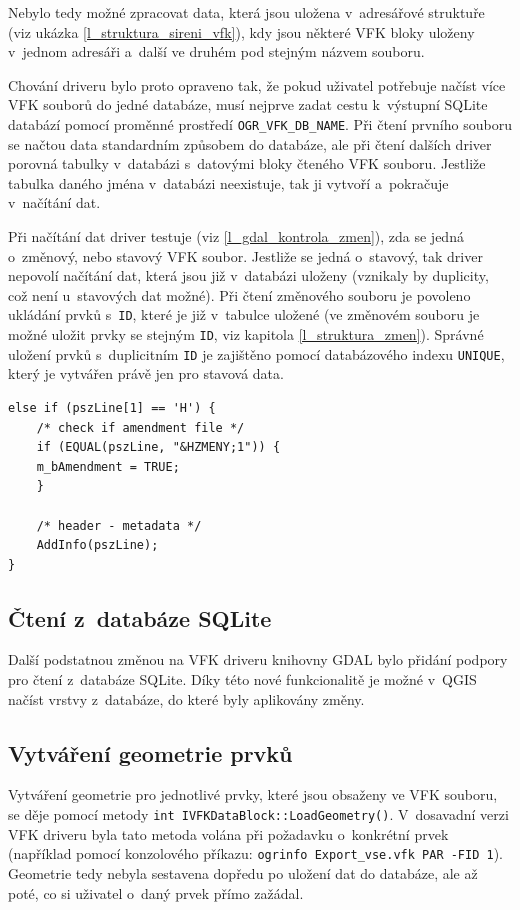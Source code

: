 \documentclass[a4paper,12pt,oneside]{book}
\begin{document}
Nebylo tedy možné zpracovat data, která jsou uložena v~adresářové struktuře (viz ukázka \ref{l_struktura_sireni_vfk}), kdy jsou některé VFK bloky uloženy v~jednom adresáři a~další ve druhém pod stejným názvem souboru.

Chování driveru bylo proto opraveno tak, že pokud uživatel potřebuje načíst více VFK souborů do jedné databáze, musí nejprve zadat cestu k~výstupní SQLite databází pomocí proměnné prostředí \texttt{OGR\_VFK\_DB\_NAME}. Při čtení prvního souboru se načtou data standardním způsobem do databáze, ale při čtení dalších driver porovná tabulky v~databázi s~datovými bloky čteného VFK souboru. Jestliže tabulka daného jména v~databázi neexistuje, tak ji vytvoří a~pokračuje v~načítání dat. 

Při načítání dat driver testuje (viz \ref{l_gdal_kontrola_zmen}), zda se jedná o~změnový, nebo stavový VFK soubor. Jestliže se jedná o~stavový, tak driver nepovolí načítání dat, která jsou již v~databázi uloženy (vznikaly by duplicity, což není u~stavových dat možné). Při čtení změnového souboru je povoleno ukládání prvků s~\texttt{ID}, které je již v~tabulce uložené (ve změnovém souboru je možné uložit prvky se stejným \texttt{ID}, viz kapitola \ref{l_struktura_zmen}). Správné uložení prvků s~duplicitním \texttt{ID} je zajištěno pomocí databázového indexu \texttt{UNIQUE}, který je vytvářen právě jen pro stavová data.

\begin{lstlisting}[style=c++, 
		    caption={Výňatek z~kódu pro kontrolu změnového souboru}, 
		    label=l_gdal_kontrola_zmen]
else if (pszLine[1] == 'H') {
    /* check if amendment file */
    if (EQUAL(pszLine, "&HZMENY;1")) {
	m_bAmendment = TRUE;
    }

    /* header - metadata */
    AddInfo(pszLine);
}
\end{lstlisting}

\subsection{Čtení z~databáze SQLite}
Další podstatnou změnou na VFK driveru knihovny GDAL bylo přidání podpory pro čtení z~databáze SQLite. Díky této nové funkcionalitě je možné v~QGIS načíst vrstvy z~databáze, do které byly aplikovány změny.

\subsection{Vytváření geometrie prvků}
Vytváření geometrie pro jednotlivé prvky, které jsou obsaženy ve VFK souboru, se děje pomocí metody \texttt{int IVFKDataBlock::LoadGeometry()}. V~dosavadní verzi VFK driveru byla tato metoda volána při požadavku o~konkrétní prvek (například pomocí konzolového příkazu: \texttt{ogrinfo Export\_vse.vfk PAR -FID 1}). Geometrie tedy nebyla sestavena dopředu po uložení dat do databáze, ale až poté, co si uživatel o~daný prvek přímo zažádal.
\end{document}
